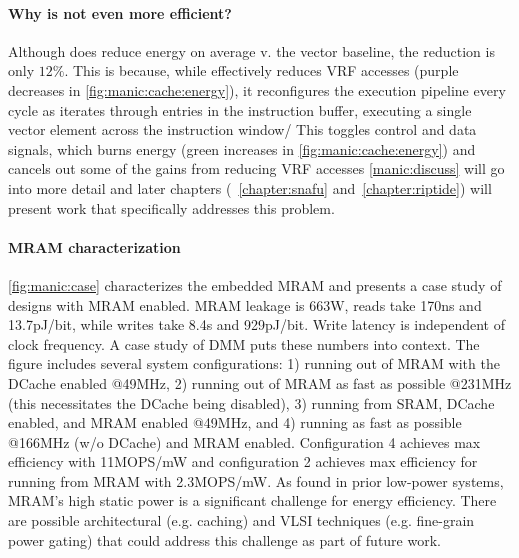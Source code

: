 \paragraph{Why is \manic not even more efficient?}
Although \manic does reduce energy on average v. the vector baseline, the reduction is only $12\%$.
% 
This is because, while \manic effectively reduces VRF accesses (purple decreases in \autoref{fig:manic:cache:energy}), it reconfigures the execution pipeline every cycle as iterates through entries in the instruction buffer, executing a single vector element across the instruction window/
% 
This toggles control and data signals, which burns energy (green increases in \autoref{fig:manic:cache:energy}) and cancels out some of the gains from reducing VRF accesses
% 
\autoref{manic:discuss} will go into more detail and later chapters (~\autoref{chapter:snafu} and~\autoref{chapter:riptide}) will present work that specifically addresses this problem.

\figMANICMRAMCase
\paragraph{MRAM characterization}
\autoref{fig:manic:case} characterizes the embedded MRAM and presents a case study of designs with MRAM enabled.
%
MRAM leakage is 663\textmu W, reads take 170ns and 13.7pJ/bit, while writes take 8.4\textmu s and 929pJ/bit.
%
Write latency is independent of clock frequency.
%
A case study of DMM puts these numbers into context.
%
The figure includes several system configurations: 1) \manic running out of MRAM with the DCache enabled @49MHz, 2) \manic running out of MRAM as fast as possible @231MHz (this necessitates the DCache being disabled), 3) \manic running from SRAM, DCache enabled, and MRAM enabled @49MHz, and 4) \manic running as fast as possible @166MHz (w/o DCache) and MRAM enabled.
%
Configuration 4 achieves max efficiency with 11MOPS/mW %
and configuration 2 achieves max efficiency for running from MRAM with 2.3MOPS/mW.
%
As found in prior low-power systems, MRAM's high static power is a significant challenge for energy efficiency.
% 
There are possible architectural (e.g. caching) and VLSI techniques (e.g. fine-grain power gating) that could address this challenge as part of future work.
